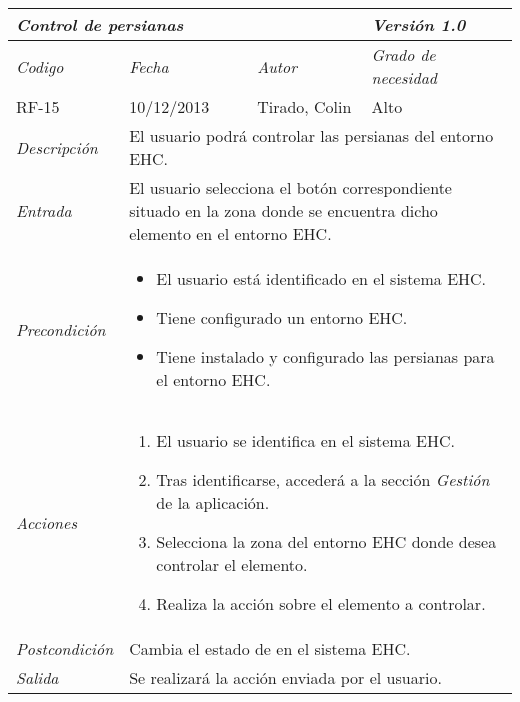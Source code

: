 \begin{tabular}{|p{3cm}|p{4cm}|p{4cm}|p{4cm}|}
\hline \multicolumn{3}{|p{9cm}|}{\textit{Control de persianas}} & \textit{Versi\'on 1.0} \\
\hline \textit{Codigo} & \textit{Fecha} & \textit{Autor} & \textit{Grado de necesidad} \\
RF-15 & 10/12/2013 & Tirado, Colin & Alto \\
\hline \textit{Descripci\'on} & \multicolumn{3}{|p{9cm}|}{El usuario podr\'a controlar las persianas del entorno EHC.} \\
\hline \textit{Entrada} & \multicolumn{3}{|p{9cm}|}{El usuario selecciona el bot\'on correspondiente situado en la zona donde se encuentra dicho elemento en el entorno EHC.} \\
\hline \textit{Precondici\'on} & \multicolumn{3}{|p{9cm}|}{
\begin{itemize}
\item El usuario est\'a identificado en el sistema EHC.
\item Tiene configurado un entorno EHC.
\item Tiene instalado y configurado las persianas para el entorno EHC.
\end{itemize}
} \\
\hline \textit{Acciones} & \multicolumn{3}{|p{9cm}|}{
\begin{enumerate}
\item El usuario se identifica en el sistema EHC.
\item Tras identificarse, acceder\'a a la secci\'on \textit{Gesti\'on} de la aplicaci\'on.
\item Selecciona la zona del entorno EHC donde desea controlar el elemento.
\item Realiza la acci\'on sobre el elemento a controlar.
\end{enumerate}
} \\
\hline \textit{Postcondici\'on} & \multicolumn{3}{|p{9cm}|}{Cambia el estado de  en el sistema EHC.} \\
\hline \textit{Salida} & \multicolumn{3}{|p{9cm}|}{Se realizar\'a la acci\'on enviada por el usuario.} \\ \hline
\end{tabular}